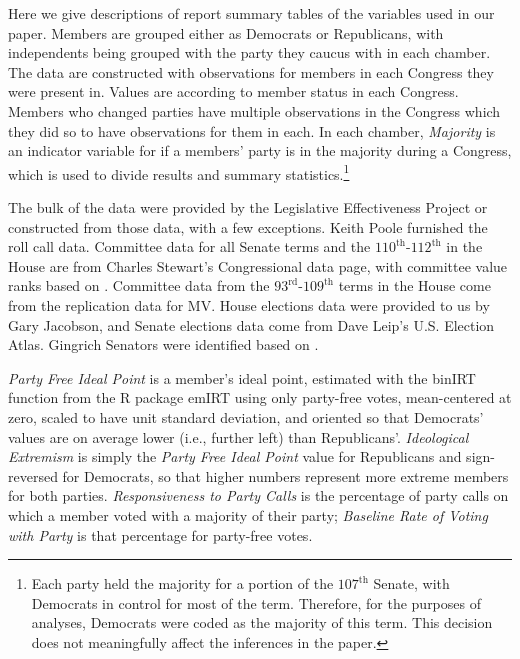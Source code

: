 \documentclass[12pt]{article}
\begin{document}
Here we give descriptions of report summary tables of the variables used in our paper. Members are grouped either as Democrats or Republicans, with independents being grouped with the party they caucus with in each chamber. The data are constructed with observations for members in each Congress they were present in. Values are according to member status in each Congress. Members who changed parties have multiple observations in the Congress which they did so to have observations for them in each. In each chamber, \textit{Majority} is an indicator variable for if a members' party is in the majority during a Congress, which is used to divide results and summary statistics.\footnote{\doublespacing\normalsize Each party held the majority for a portion of the $107^{\text{th}}$ Senate, with Democrats in control for most of the term.  Therefore, for the purposes of analyses, Democrats were coded as the majority of this term.  This decision does not meaningfully affect the inferences in the paper.}

The bulk of the data were provided by the Legislative Effectiveness Project \citep{Volden:2014} or constructed from those data, with a few exceptions. Keith Poole furnished the roll call data.  Committee data for all Senate terms and the $110^{\text{th}}$-$112^{\text{th}}$ in the House are from Charles Stewart's Congressional data page, with committee value ranks based on \citep{Groseclose:1998}.  Committee data from the $93^{\text{rd}}$-$109^{\text{th}}$ terms in the House come from the replication data for MV.  House elections data were provided to us by Gary Jacobson, and Senate elections data come from Dave Leip's U.S. Election Atlas.
Gingrich Senators were identified based on \citep{Theriault:2013}.

\textit{Party Free Ideal Point} is a member's ideal point, estimated with the \textsf{binIRT} function from the \textsf{R} package \textsf{emIRT} using only party-free votes, mean-centered at zero, scaled to have unit standard deviation, and oriented so that Democrats' values are on average lower (i.e., further left) than Republicans'. \textit{Ideological Extremism} is simply the \textit{Party Free Ideal Point} value for Republicans and sign-reversed for Democrats, so that higher numbers represent more extreme members for both parties. \textit{Responsiveness to Party Calls} is the percentage of party calls on which a member voted with a majority of their party; \textit{Baseline Rate of Voting with Party} is that percentage for party-free votes.
\end{document}
